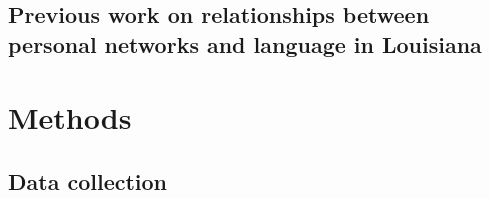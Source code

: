     \subsection{Previous work on relationships between personal networks and language in Louisiana}
  \section{Methods}
    \subsection{Data collection}
